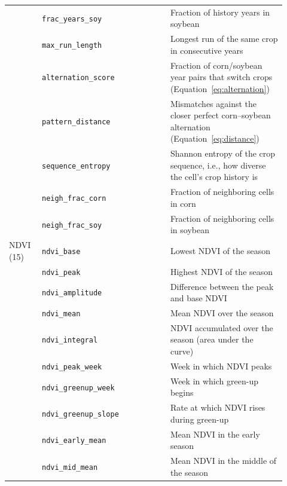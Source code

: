 \documentclass[10pt,letterpaper]{article}
\begin{document}
{\begin{longtable}{@{}>{\raggedright\arraybackslash}p{0.11\linewidth}>{\raggedright\arraybackslash}p{0.43\linewidth}>{\raggedright\arraybackslash}p{0.38\linewidth}@{}}
& \texttt{frac\_years\_soy} & Fraction of history years in soybean \\

& \texttt{max\_run\_length} & Longest run of the same crop in consecutive years \\

& \texttt{alternation\_score} & Fraction of corn/soybean year pairs that switch crops (Equation~\ref{eq:alternation}) \\

& \texttt{pattern\_distance} & Mismatches against the closer perfect corn--soybean alternation (Equation~\ref{eq:distance}) \\

& \texttt{sequence\_entropy} & Shannon entropy of the crop sequence, i.e., how diverse the cell's crop history is \\

& \texttt{neigh\_frac\_corn} & Fraction of neighboring cells in corn \\

& \texttt{neigh\_frac\_soy} & Fraction of neighboring cells in soybean \\

NDVI (15) & \texttt{ndvi\_base} & Lowest NDVI of the season \\

& \texttt{ndvi\_peak} & Highest NDVI of the season \\

& \texttt{ndvi\_amplitude} & Difference between the peak and base NDVI \\

& \texttt{ndvi\_mean} & Mean NDVI over the season \\

& \texttt{ndvi\_integral} & NDVI accumulated over the season (area under the curve) \\

& \texttt{ndvi\_peak\_week} & Week in which NDVI peaks \\

& \texttt{ndvi\_greenup\_week} & Week in which green-up begins \\

& \texttt{ndvi\_greenup\_slope} & Rate at which NDVI rises during green-up \\

& \texttt{ndvi\_early\_mean} & Mean NDVI in the early season \\

& \texttt{ndvi\_mid\_mean} & Mean NDVI in the middle of the season \\


\end{longtable}}
\end{document}
